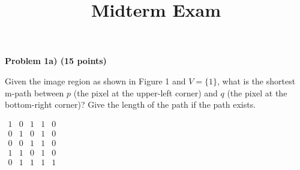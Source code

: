 \documentclass[12pt]{article}
\title{\textbf{Midterm Exam}}
\author{}
\date{}
\newcommand{\problem}[1]{%
  \vspace{0.5cm}
  {\noindent\normalsize \textbf{#1}}
  \vspace{0.3cm}
}
\begin{document}
\thispagestyle{fancy}
\setlength{\parindent}{0pt}



\problem{Problem 1a) (15 points)}

Given the image region as shown in Figure 1 and $V = \{1\}$, what is the shortest m-path between $p$
(the pixel at the upper-left corner) and $q$ (the pixel at the bottom-right corner)? Give the length of
the path if the path exists.

\begin{center}
$\begin{array}{ccccc}
1 & 0 & 1 & 1 & 0 \\
0 & 1 & 0 & 1 & 0 \\
0 & 0 & 1 & 1 & 0 \\
1 & 1 & 0 & 1 & 0 \\
0 & 1 & 1 & 1 & 1
\end{array}$
\end{center}

\vspace{0.5cm}
\end{document}
